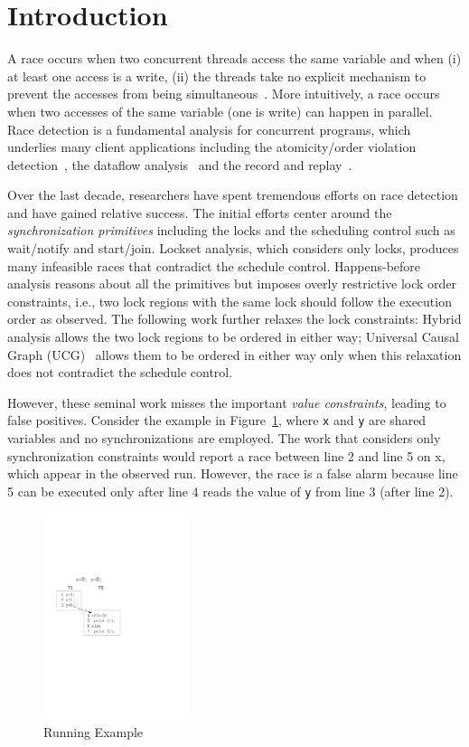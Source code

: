 \section{Introduction}\label{Se:introduction}
A race occurs when two concurrent threads access the same variable and when (i) at least one access is a write, (ii) the threads take no explicit mechanism to prevent the accesses from being simultaneous~\cite{eraser}. More intuitively, a race occurs when two accesses of the same variable (one is write) can happen in parallel.  Race detection is a fundamental analysis for concurrent programs, which underlies  many client applications including the atomicity/order violation detection~\cite{learning,avio,ordervio}, the dataflow analysis~\cite{dataflow} and the record and replay~\cite{leap,replay2012}. 


Over the last decade, researchers have spent tremendous efforts on race detection and have gained relative success. 
The initial efforts center around the {\em synchronization primitives} including the locks and the scheduling control such as wait/notify and start/join. Lockset analysis, which considers only locks, produces many infeasible races that contradict the schedule control. Happens-before analysis reasons about all the primitives but imposes overly restrictive lock order constraints, i.e., two lock regions with the same lock should follow the execution order as observed. The following work further relaxes the lock constraints: Hybrid analysis allows the two lock regions to be ordered in either way; {\sf Universal Causal Graph (UCG)}~\cite{ucg} allows them to be ordered in either way only when this relaxation does not contradict the schedule control.  

However, these seminal work misses the important {\em value constraints}, leading to false positives. Consider the example in Figure~\ref{fig:running}, 
where {\tt x} and {\tt y} are shared variables and no synchronizations are employed. The work that considers only synchronization constraints would report a race between line 2 and line 5 on x, which appear in the observed run. However, the race is a false alarm because line 5 can be executed only after line 4 reads the value of {\tt y} from line 3 (after line 2). 

\begin{figure}
\centering
\includegraphics[width=0.38\textwidth]{figs/Visio-running.pdf}
\caption{Running Example}
\label{fig:running}
\end{figure}


